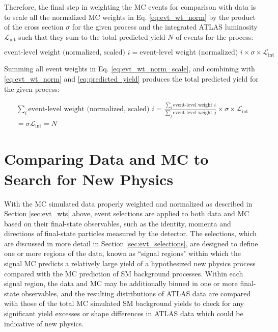 Therefore, the final step in weighting the MC events for comparison with data is to scale all the normalized MC weights in Eq. \ref{eq:evt_wt_norm} by the product of the cross section \(\sigma\) for the given process and the integrated ATLAS luminosity \(\mathcal{L}_\text{int}\) such that they sum to the total predicted yield \(N\) of events for the process:

\begin{equation}
\label{eq:evt_wt_norm_scale}
\text{event-level weight (normalized, scaled) }i = \text{event-level weight (normalized) }i \times \sigma \times \mathcal{L}_\text{int}
\end{equation}

\noindent Summing all event weights in Eq. \ref{eq:evt_wt_norm_scale}, and combining with \ref{eq:evt_wt_norm} and \ref{eq:predicted_yield} produces the total predicted yield for the given process:

\begin{multline}
\label{eq:evt_wt_sum}
\sum_i\text{event-level weight (normalized, scaled) }i = \frac{\sum_i \text{event-level weight }i}{\sum_j \text{event-level weight }j}\times \sigma \times \mathcal{L}_\text{int} \\
 = \sigma\mathcal{L}_\text{int} = N
\end{multline}

\section{Comparing Data and MC to Search for New Physics}

With the MC simulated data properly weighted and normalized as described in Section \ref{sec:evt_wts} above, event selections are applied to both data and MC based on their final-state observables, such as the identity, momenta and directions of final-state particles measured by the detector. The selections, which are discussed in more detail in Section \ref{sec:evt_selections}, are designed to define one or more regions of the data, known as ``signal regions" within which the signal MC predicts a relatively large yield of a hypothesized new physics process compared with the MC prediction of SM background processes. Within each signal region, the data and MC may be additionally binned in one or more final-state observables, and the resulting distributions of ATLAS data are compared with those of the total MC simulated SM background yields to check for any significant yield excesses or shape differences in ATLAS data which could be indicative of new physics.

